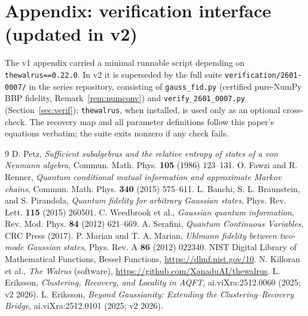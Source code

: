 \documentclass[11pt]{article}
\theoremstyle{remark}
\begin{document}
\section{Appendix: verification interface (updated in v2)}
The v1 appendix carried a minimal runnable script depending on
\texttt{thewalrus==0.22.0}. In v2 it is superseded by the full suite
\texttt{verification/2601-0007/} in the series repository, consisting of
\texttt{gauss\_fid.py} (certified pure-NumPy BBP fidelity,
Remark~\ref{rem:numconv}) and \texttt{verify\_2601\_0007.py}
(Section~\ref{sec:verif}); \texttt{thewalrus}, when installed, is used only
as an optional cross-check. The recovery map and all parameter definitions
follow this paper's equations verbatim; the suite exits nonzero if any
check fails.

\begin{thebibliography}{9}
 D. Petz, \emph{Sufficient subalgebras and the relative
entropy of states of a von Neumann algebra}, Commun. Math. Phys.
\textbf{105} (1986) 123--131.
 O. Fawzi and R. Renner, \emph{Quantum conditional mutual
information and approximate Markov chains}, Commun. Math. Phys.
\textbf{340} (2015) 575--611.
 L. Banchi, S. L. Braunstein, and S. Pirandola, \emph{Quantum
fidelity for arbitrary Gaussian states}, Phys. Rev. Lett. \textbf{115}
(2015) 260501.
 C. Weedbrook et al., \emph{Gaussian quantum
information}, Rev. Mod. Phys. \textbf{84} (2012) 621--669.
 A. Serafini, \emph{Quantum Continuous Variables}, CRC
Press (2017).
 P. Marian and T. A. Marian, \emph{Uhlmann fidelity between
two-mode Gaussian states}, Phys. Rev. A \textbf{86} (2012) 022340.
 NIST Digital Library of Mathematical Functions, Bessel
Functions, \url{https://dlmf.nist.gov/10}.
 N. Killoran et al., \emph{The Walrus} (software),
\url{https://github.com/XanaduAI/thewalrus}.
 L. Eriksson, \emph{Clustering, Recovery, and Locality in
AQFT}, ai.viXra:2512.0060 (2025; v2 2026).
 L. Eriksson, \emph{Beyond Gaussianity: Extending the
Clustering--Recovery Bridge}, ai.viXra:2512.0101 (2025; v2 2026).
\end{thebibliography}
\end{document}
